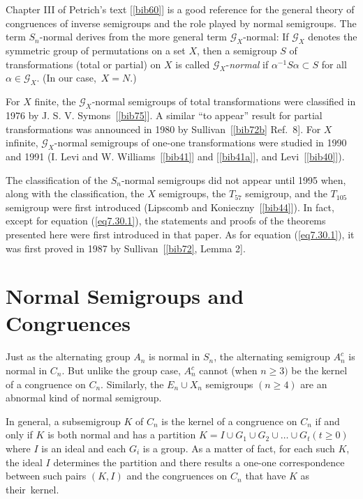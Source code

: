 \documentclass{surv-l}
\numberwithin{equation}{section}
\numberwithin{table}{section}
\numberwithin{figure}{section}
\theoremstyle{plain}
\theoremstyle{definition}
\begin{document}
Chapter III of Petrich's text [\ref{bib60}] is a
good reference for the general theory of congruences of inverse
semigroups and the role played by normal semigroups. The term
$S_{n}$-normal derives from the more general term
$\mathcal{G}_X$-normal: If $\mathcal{G}_X$ denotes the symmetric
group of permutations on a set $X$, then a semigroup $S$ of
transformations (total or partial) on $X$ is called
$\mathcal{G}_X$-\emph{normal} if $\alpha^{-1}S\alpha \subset S$
for all $\alpha\in \mathcal{G}_X$. (In our case,~$X=N$.)

For $X$ finite, the $\mathcal{G}_X$-normal semigroups of total
transformations were classified in 1976 by J. S. V.
Symons~[\ref{bib75}]. A
similar ``to appear'' result for partial transformations was
announced in 1980 by Sullivan~[\ref{bib72b} Ref.~8]. For $X$ infinite,
$\mathcal{G}_X$-normal semigroups of one-one transformations were
studied in 1990 and 1991 (I. Levi and W.
Williams~[\ref{bib41}] and
[\ref{bib41a}], and Levi~[\ref{bib40}]).

The classification of the $S_{n}$-normal semigroups did not appear
until 1995 when, along with the classification, the $X$
semigroups, the $T_{57}$ semigroup, and the $T_{105}$ semigroup
were first introduced (Lipscomb and
Konieczny~[\ref{bib44}]). In fact, except for
equation (\ref{eq7.30.1}), the statements and proofs of the
theorems presented here were first introduced in that paper. As
for equation (\ref{eq7.30.1}), it was first proved in 1987 by
Sullivan~[\ref{bib72}, Lemma 2].

\chapter{Normal Semigroups and Congruences}\label{chap8}

Just as the alternating group $A_{n}$ is normal in $S_{n}$, the
alternating semigroup $A_{n}^{c}$ is normal in $C_{n}$. But unlike
the group case, $A_{n}^{c}$ cannot (when $n\geq 3)$ be the kernel
of a congruence on $C_{n}$. Similarly, the
$E_{n}\cup X_{n}$ semigroups $(n\geq 4)$ are an abnormal kind of
normal semigroup.

In general, a subsemigroup $K$ of $C_{n}$ is the kernel of a
congruence on $C_{n}$ if and only if $K$ is both normal and has a
partition $K=I \cup G_{1}\cup G_{2}\cup\ldots\cup G_{t} (t\geq 0)$
where $I$ is an ideal and each $G_{i}$ is a group. As a matter of
fact, for each such $K$, the ideal $I$ determines the partition and
there results a one-one correspondence between such pairs $(K, I)$
and the congruences on $C_{n}$ that have $K$ as their~kernel.
\end{document}
